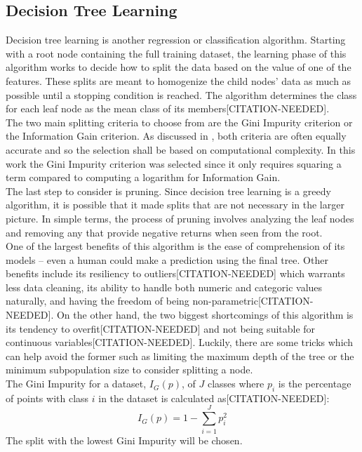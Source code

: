 \documentclass[titlepage]{article}
\begin{document}
\subsection{Decision Tree Learning}
Decision tree learning is another regression or classification algorithm. Starting with a root node containing the full training dataset, the learning phase of this algorithm works to decide how to split the data based on the value of one of the features. These splits are meant to homogenize the child nodes' data as much as possible until a stopping condition is reached. The algorithm determines the class for each leaf node as the mean class of its members[CITATION-NEEDED].\\
The two main splitting criteria to choose from are the Gini Impurity criterion or the Information Gain criterion. As discussed in \cite{Gini-Index}, both criteria are often equally accurate and so the selection shall be based on computational complexity. In this work the Gini Impurity criterion was selected since it only requires squaring a term compared to computing a logarithm for Information Gain.\\
The last step to consider is pruning. Since decision tree learning is a greedy algorithm, it is possible that it made splits that are not necessary in the larger picture. In simple terms, the process of pruning involves analyzing the leaf nodes and removing any that provide negative returns when seen from the root.\\
One of the largest benefits of this algorithm is the ease of comprehension of its models -- even a human could make a prediction using the final tree. Other benefits include its resiliency to outliers[CITATION-NEEDED] which warrants less data cleaning, its ability to handle both numeric and categoric values naturally, and having the freedom of being non-parametric[CITATION-NEEDED]. On the other hand, the two biggest shortcomings of this algorithm is its tendency to overfit[CITATION-NEEDED] and not being suitable for continuous variables[CITATION-NEEDED]. Luckily, there are some tricks which can help avoid the former such as limiting the maximum depth of the tree or the minimum subpopulation size to consider splitting a node.\\
The Gini Impurity for a dataset, $I_G(p)$, of $J$ classes where $p_i$ is the percentage of points with class $i$ in the dataset is calculated as[CITATION-NEEDED]:
$$I_G(p) = 1 - \sum\limits_{i=1}^J p_i^2$$
The split with the lowest Gini Impurity will be chosen.
\end{document}

